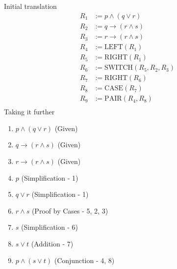 \documentclass[11pt]{article}
\makeatletter
\def\imp{\rightarrow}
\renewenvironment{proof}[1][\proofname]{\par
  \normalfont \topsep6\p@\@plus6\p@\relax
  \trivlist
  \item[\hskip\labelsep
        \itshape
    #1\@addpunct{.}]\ignorespaces
}{%
  \endtrivlist\@endpefalse
}
\makeatother
\begin{document}
\subsection{} %
Initial translation
\begin{align*}
	R_1 &:= p \land (q \lor r) \\
	R_2 &:= q \imp (r \land s) \\
	R_3 &:= r \imp (r \land s) \\
	R_4 &:= \text{LEFT}(R_1) \tag*{// $p$} \\
	R_5 &:= \text{RIGHT}(R_1) \tag*{// $(q \lor r)$} \\
	R_6 &:= \text{SWITCH}(R_5, R_2, R_3) \tag*{// $(r \land s)$} \\
	R_7 &:= \text{RIGHT}(R_6) \tag*{// $s$} \\
	R_8 &:= \text{CASE}(R_7) \tag*{// $(s \lor t)$} \\
	R_9 &:= \text{PAIR}(R_4, R_8) \tag*{// $p \land (s \lor t)$} \\
\end{align*}
Taking it further
\begin{proof}[\textbf{Prove $q \land t$}] \leavevmode
 	\begin{enumerate}
		\item $p \land (q \lor r)$ \hfill (Given)
		\item $q \imp (r \land s)$ \hfill (Given)
		\item $r \imp (r \land s)$ \hfill (Given)
		\item $p$ \hfill (Simplification - 1)
		\item $q \lor r$ \hfill (Simplification - 1)
		\item $r \land s$ \hfill (Proof by Cases - 5, 2, 3)
		\item $s$ \hfill (Simplification - 6)
		\item $s \lor t$ \hfill (Addition - 7)
		\item $p \land (s \lor t)$ \hfill (Conjunction - 4, 8)
	\end{enumerate}
\end{proof}
\end{document}
